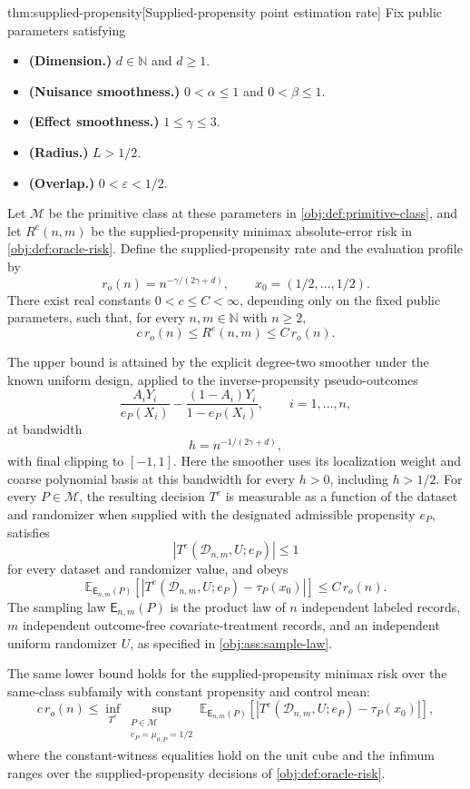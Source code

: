 \begin{theoremv}{thm:supplied-propensity}[Supplied-propensity point estimation rate]
Fix public parameters satisfying
\begin{itemize}
\item \textbf{(Dimension.)} \(d\in\mathbb N\) and \(d\ge1\).
\item \textbf{(Nuisance smoothness.)} \(0<\alpha\le1\) and \(0<\beta\le1\).
\item \textbf{(Effect smoothness.)} \(1\le\gamma\le3\).
\item \textbf{(Radius.)} \(L>1/2\).
\item \textbf{(Overlap.)} \(0<\varepsilon<1/2\).
\end{itemize}
Let \(\mathcal M\) be the primitive class at these parameters in \cref{obj:def:primitive-class}, and let \(R^e(n,m)\) be the supplied-propensity minimax absolute-error risk in \cref{obj:def:oracle-risk}. Define the supplied-propensity rate and the evaluation profile by
\[
r_o(n)=n^{-\gamma/(2\gamma+d)},
\qquad
x_0=(1/2,\ldots,1/2).
\]
There exist real constants \(0<c\le C<\infty\), depending only on the fixed public parameters, such that, for every \(n,m\in\mathbb N\) with \(n\ge2\),
\[
c\,r_o(n)\le R^e(n,m)\le C\,r_o(n).
\]

The upper bound is attained by the explicit degree-two smoother under the known uniform design, applied to the inverse-propensity pseudo-outcomes
\[
\frac{A_iY_i}{e_P(X_i)}
-
\frac{(1-A_i)Y_i}{1-e_P(X_i)},
\qquad i=1,\ldots,n,
\]
at bandwidth
\[
h=n^{-1/(2\gamma+d)},
\]
with final clipping to \([-1,1]\). Here the smoother uses its localization weight and coarse polynomial basis at this bandwidth for every \(h>0\), including \(h>1/2\). For every \(P\in\mathcal M\), the resulting decision \(T^e\) is measurable as a function of the dataset and randomizer when supplied with the designated admissible propensity \(e_P\), satisfies
\[
\left|T^e(\mathcal D_{n,m},U;e_P)\right|\le1
\]
for every dataset and randomizer value, and obeys
\[
\mathbb E_{\mathsf E_{n,m}(P)}
\left[
\left|T^e(\mathcal D_{n,m},U;e_P)-\tau_P(x_0)\right|
\right]
\le C\,r_o(n).
\]
The sampling law \(\mathsf E_{n,m}(P)\) is the product law of \(n\) independent labeled records, \(m\) independent outcome-free covariate-treatment records, and an independent uniform randomizer \(U\), as specified in \cref{obj:ass:sample-law}.

The same lower bound holds for the supplied-propensity minimax risk over the same-class subfamily with constant propensity and control mean:
\[
c\,r_o(n)\le
\inf_{T^e}
\sup_{\substack{P\in\mathcal M\\ e_P=\mu_{0,P}=1/2}}
\mathbb E_{\mathsf E_{n,m}(P)}
\left[
\left|T^e(\mathcal D_{n,m},U;e_P)-\tau_P(x_0)\right|
\right],
\]
where the constant-witness equalities hold on the unit cube and the infimum ranges over the supplied-propensity decisions of \cref{obj:def:oracle-risk}.
\end{theoremv}

